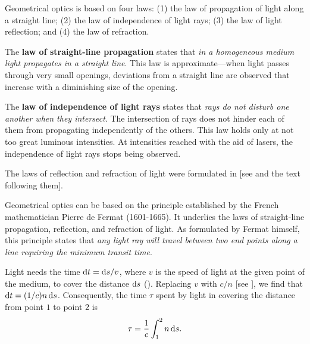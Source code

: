 Geometrical optics is based on four laws: (1) the law of propagation of light along a straight line; (2) the law of independence of light rays; (3) the law of light reflection; and (4) the law of refraction.

The \textbf{law of straight-line propagation} states that \textit{in a homogeneous medium light propagates in a straight line}.
This law is approximate---when light passes through very small openings, deviations from a straight line
are observed that increase with a diminishing size of the opening.

The \textbf{law of independence of light rays} states
that \textit{rays do not disturb one another when they intersect}.
The intersection of rays does not hinder each of them from propagating independently of the others. This law holds only at not too great luminous intensities.
At intensities reached with the aid of lasers, the independence of light rays stops being observed.

The laws of reflection and refraction of light were formulated in  [see  and the text following them].

Geometrical optics can be based on the principle established by the French mathematician Pierre de Fermat (1601-1665).
It underlies the laws of straight-line propagation, reflection, and refraction of light. As formulated by Fermat himself, this principle states that \textit{any light ray will travel between two end points along a line requiring the minimum transit time}.

Light needs the time $\mathrm{d} t = \mathrm{d} s/v$, where $v$ is the speed of light at the given point of the medium, to cover the distance $\mathrm{d} s$ ().
Replacing $v$ with $c/n$ [see ], we find that $\mathrm{d} t=(1/c)n\,\mathrm{d} s$.
Consequently, the time $\tau$ spent by light in covering the distance from point $1$ to point $2$ is
\begin{equation}\label{eq:16_51}
    \tau = \frac{1}{c} \int_1^2 n\, \mathrm{d} s.
\end{equation}

